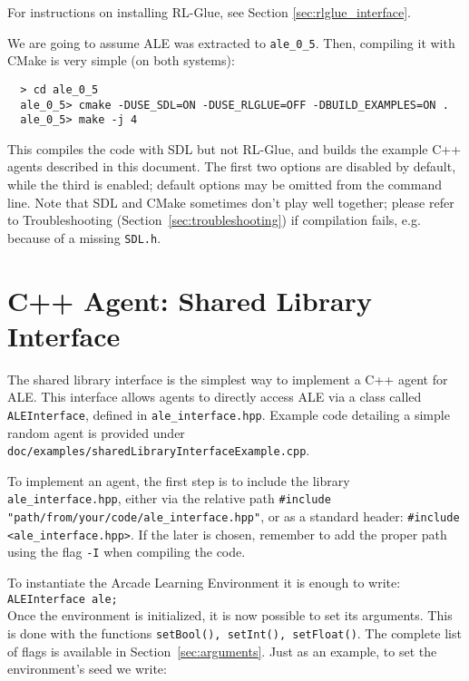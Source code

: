 \documentclass[12pt]{article}
\begin{document}
For instructions on installing RL-Glue, see Section \ref{sec:rlglue_interface}.

We are going to assume ALE was extracted to \verb+ale_0_5+. Then, compiling it
with CMake is very simple (on both systems):
\begin{verbatim}
  > cd ale_0_5
  ale_0_5> cmake -DUSE_SDL=ON -DUSE_RLGLUE=OFF -DBUILD_EXAMPLES=ON .
  ale_0_5> make -j 4
\end{verbatim}

This compiles the code with SDL but not RL-Glue, and builds the example C++ agents described
in this document. The first two options are disabled by default, while the third is
enabled; default options may be omitted from the command line. Note that SDL and CMake sometimes 
don't play well together; please refer to Troubleshooting 
(Section~\ref{sec:troubleshooting}) if compilation fails, e.g. because of a missing \verb+SDL.h+.

\section{C++ Agent: Shared Library Interface} \label{sec:shared_library_interface}

The shared library interface is the simplest way to implement a C++ agent for ALE.
This interface allows agents to directly access ALE via a class called
\verb+ALEInterface+, defined in \verb+ale_interface.hpp+. Example code detailing a simple random agent is provided under \verb+doc/examples/sharedLibraryInterfaceExample.cpp+.

To implement an agent, the first step is to include the library \verb+ale_interface.hpp+, either via 
the relative path \verb+#include "path/from/your/code/ale_interface.hpp"+, or as a standard 
header: \verb+#include <ale_interface.hpp>+. If the later is chosen, remember to add the proper 
path using the flag \verb+-I+ when compiling the code.

To instantiate the Arcade Learning Environment it is enough to write:\\

\verb+ALEInterface ale;+\\

Once the environment is initialized, it is now possible to set its arguments. This is done with the 
functions \verb+setBool(), setInt(), setFloat()+. The complete list of flags is available in 
Section~\ref{sec:arguments}. Just as an example, to set the environment's seed we write:\\
\end{document}
